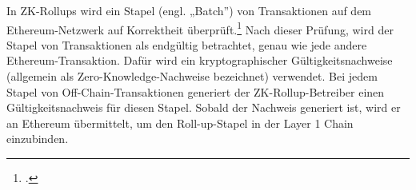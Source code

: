 \begin{itemize}
    \noindent
    In ZK-Rollups wird ein Stapel (engl. „Batch”) von Transaktionen auf dem Ethereum-Netzwerk auf Korrektheit überprüft.\footcite[Vgl. hierzu und zum Folgenden sowie weiterführend][]{w23}
    Nach dieser Prüfung, wird der Stapel von Transaktionen als endgültig betrachtet, genau wie jede andere Ethereum-Transaktion. Dafür wird ein kryptographischer Gültigkeitsnachweise (allgemein als Zero-Knowledge-Nachweise bezeichnet) verwendet. 
    Bei jedem Stapel von Off-Chain-Transaktionen generiert der ZK-Rollup-Betreiber einen Gültigkeitsnachweis für diesen Stapel. Sobald der Nachweis generiert ist, wird er an Ethereum übermittelt, um den Roll-up-Stapel in der Layer 1 Chain einzubinden.
\end{itemize}